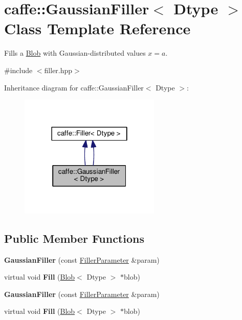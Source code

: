 \hypertarget{classcaffe_1_1_gaussian_filler}{}\section{caffe\+:\+:Gaussian\+Filler$<$ Dtype $>$ Class Template Reference}
\label{classcaffe_1_1_gaussian_filler}


Fills a \mbox{\hyperlink{classcaffe_1_1_blob}{Blob}} with Gaussian-\/distributed values $ x = a $.  




{\ttfamily \#include $<$filler.\+hpp$>$}



Inheritance diagram for caffe\+:\+:Gaussian\+Filler$<$ Dtype $>$\+:
\nopagebreak
\begin{figure}[H]
\begin{center}
\leavevmode
\includegraphics[width=190pt]{classcaffe_1_1_gaussian_filler__inherit__graph}
\end{center}
\end{figure}
\subsection*{Public Member Functions}
\begin{DoxyCompactItemize}
\item 
\mbox{\label{classcaffe_1_1_gaussian_filler_a37a676739d64cf07b61767c99dd821b2}} 
{\bfseries Gaussian\+Filler} (const \mbox{\hyperlink{classcaffe_1_1_filler_parameter}{Filler\+Parameter}} \&param)
\item 
\mbox{\label{classcaffe_1_1_gaussian_filler_ac45d5d0695521d7d71a4d5bccb659f21}} 
virtual void {\bfseries Fill} (\mbox{\hyperlink{classcaffe_1_1_blob}{Blob}}$<$ Dtype $>$ $\ast$blob)
\item 
\mbox{\label{classcaffe_1_1_gaussian_filler_a37a676739d64cf07b61767c99dd821b2}} 
{\bfseries Gaussian\+Filler} (const \mbox{\hyperlink{classcaffe_1_1_filler_parameter}{Filler\+Parameter}} \&param)
\item 
\mbox{\label{classcaffe_1_1_gaussian_filler_ac45d5d0695521d7d71a4d5bccb659f21}} 
virtual void {\bfseries Fill} (\mbox{\hyperlink{classcaffe_1_1_blob}{Blob}}$<$ Dtype $>$ $\ast$blob)
\end{DoxyCompactItemize}
